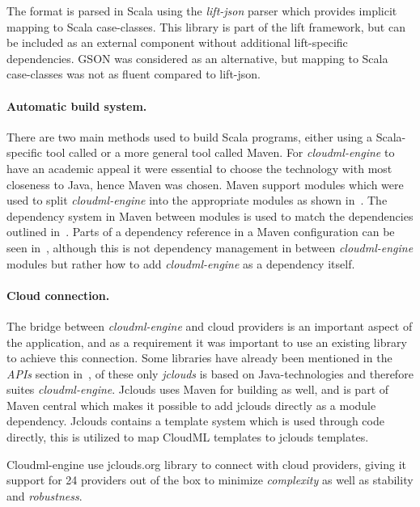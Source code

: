 The  format is parsed in Scala using the \emph{lift-json} parser which provides implicit
mapping to Scala case-classes. This library is part of the lift framework,
but can be included as an external component without additional lift-specific dependencies.
GSON was considered as an alternative, but mapping to Scala case-classes was not as 
fluent compared to lift-json.

\paragraph{Automatic build system.}

There are two main methods used to build Scala programs, either using a Scala-specific tool called 
 or a more general tool called Maven. 
For \emph{cloudml-engine} to have an academic appeal it were essential to choose the technology
with most closeness to Java, hence Maven was chosen.
Maven support modules which were used to split \emph{cloudml-engine} into the appropriate 
modules as shown in~. 
The dependency system in Maven between modules is used to match the dependencies outlined in~.
Parts of a dependency reference in a Maven configuration can be seen in~,
although this is not dependency management in between \emph{cloudml-engine} modules but rather
how to add \emph{cloudml-engine} as a dependency itself.

\paragraph{Cloud connection.}

The bridge between \emph{cloudml-engine} and cloud providers is an important aspect of the application, 
and as a requirement
it was important to use an existing library to achieve this connection.
Some libraries have already been mentioned in the \emph{APIs} section in~,
of these only \emph{jclouds} is based on Java-technologies and therefore suites \emph{cloudml-engine}.
Jclouds uses Maven for building as well, and is part of Maven central which makes 
it possible to add jclouds directly as a module dependency.
Jclouds contains a template system which is used through code directly, this is utilized 
to map CloudML templates to jclouds templates.

\hr

Cloudml-engine use jclouds.org library to connect with cloud providers, giving it support
for 24 providers out of the box to minimize \emph{complexity} as well as stability and \emph{robustness}.

